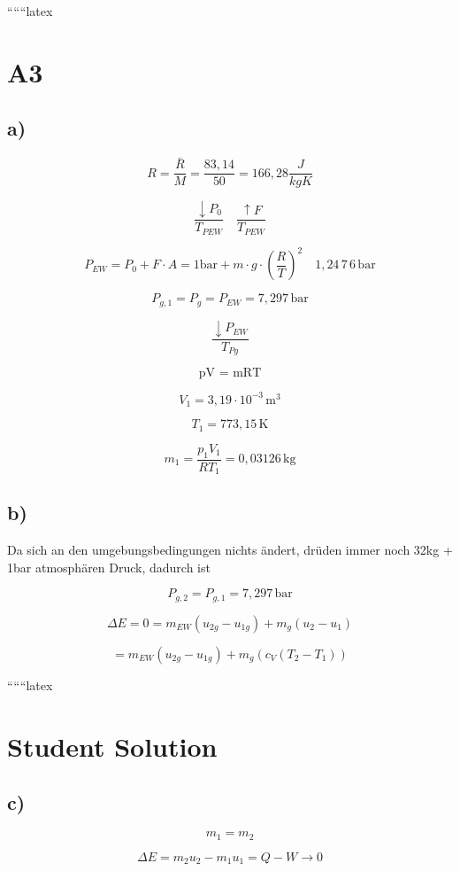 
``````latex

\section*{A3}

\subsection*{a)}

\[
R = \frac{\bar{R}}{M} = \frac{83,14}{50} = 166,28 \frac{J}{kgK}
\]

\[
\frac{\downarrow P_0}{T_{PEW}} \quad \frac{\uparrow F}{T_{PEW}}
\]

\[
P_{EW} = P_0 + F \cdot A = 1 \text{bar} + m \cdot g \cdot \left( \frac{R}{T} \right)^2 \quad 1,24 \, 7 \, 6 \, \text{bar}
\]

\[
P_{g,1} = P_{g} = P_{EW} = 7,297 \, \text{bar}
\]

\[
\frac{\downarrow P_{EW}}{T_{Pg}}
\]

\[
\text{pV = mRT}
\]

\[
V_1 = 3,19 \cdot 10^{-3} \, \text{m}^3
\]

\[
T_1 = 773,15 \, \text{K}
\]

\[
m_1 = \frac{p_1 V_1}{R T_1} = 0,03126 \, \text{kg}
\]

\subsection*{b)}

Da sich an den umgebungsbedingungen nichts ändert, drüden immer noch 32kg + 1bar atmosphären Druck, dadurch ist

\[
P_{g,2} = P_{g,1} = 7,297 \, \text{bar}
\]

\[
\Delta E = 0 = m_{EW} (u_{2g} - u_{1g}) + m_g (u_2 - u_1)
\]

\[
= m_{EW} (u_{2g} - u_{1g}) + m_g (c_V (T_2 - T_1))
\]

``````latex


\section*{Student Solution}

\subsection*{c)}

\[
m_1 = m_2
\]

\[
\Delta E = m_2 u_2 - m_1 u_1 = Q - W \rightarrow 0
\]

